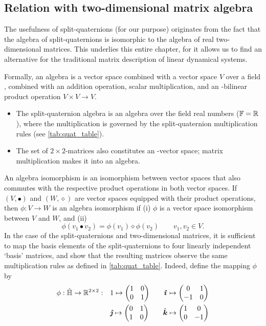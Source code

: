 \subsection{Relation with two-dimensional matrix algebra}
\label{ssec:quat_isomorphism}
The usefulness of split-quaternions (for our purpose) originates from the fact that the algebra of split-quaternions is isomorphic to the algebra of real two-dimensional matrices. This underlies this entire chapter, for it allows us to find an alternative for the traditional matrix description of linear dynamical systems. 

Formally, an algebra is a vector space combined with a vector space $V$ over a field \field, combined with an addition operation, scalar multiplication, and an \field-bilinear product operation $V\times V \to V$. \cite{Schuller2014}
\begin{itemize}
    \item The split-quaternion algebra is an algebra over the field real numbers ($\mathbb{F} = \mathbb{R}$), where the multiplication is governed by the split-quaternion multiplication rules (see \cref{tab:quat_table}).
    \item The set of $2\times2$-matrices also constitutes an \real-vector space; matrix multiplication makes it into an algebra.
\end{itemize}
An algebra isomorphism is an isomorphism between vector spaces that also commutes with the respective product operations in both vector spaces. If $(V, \bullet)$ and $(W, \diamond)$ are vector spaces equipped with their product operations, then $\phi: V \to W$ is an algebra isomorphism if (i) $\phi$ is a vector space isomorphism between $V$ and $W$, and (ii) \cite{Lang2002}
$$ \phi(v_1 \bullet v_2) = \phi(v_1)\diamond\phi(v_2) \qquad v_1, v_2 \in V. $$
In the case of the split-quaternions and two-dimensional matrices, it is sufficient to map the basis elements of the split-quaternions to four linearly independent `basis' matrices, and show that the resulting matrices observe the same multiplication rules as defined in \cref{tab:quat_table}. Indeed, define the mapping $\phi$ by 
\begin{equation}
    \begin{split}
        \phi: \spquaternions \to \real^{2\times2}: \quad &  
         1 \mapsto  \mqty(1 & 0 \\ 0 & 1) \qquad
        \quati \mapsto  \mqty(0 & 1 \\  -1 & 0) \\
        & \quatj \mapsto  \mqty(0 & 1 \\  1 & 0)\qquad 
        \quatk \mapsto  \mqty(1 & 0 \\  0 & -1) \\
    \end{split}
    \label{eq:basis_elements}
\end{equation}
